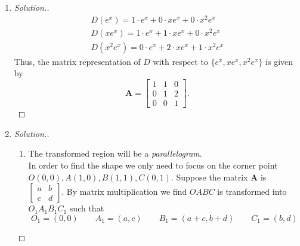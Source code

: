 \begin{enumerate}
\begin{proof}
\begin{enumerate}
\[\begin{pmatrix}
\end{pmatrix}+m_3\begin{pmatrix}
0\\0\\0\\1\\2\\1
\end{pmatrix}
\]
where $m_1,m_2,m_3\in\mathbb{R}$.\\
Therefore, $f\in\ker T$ if and only if for any $m_1,m_2,m_3\in\mathbb{R}$,
\[
\begin{aligned}
f&=m_1+m_2x+m_2y+m_3x^2+2m_3xy+m_3y^2\\
 &=m_1\x1+m_2(x+y)+m_3(x^2+2xy+y^2)
\end{aligned}
\]
Obviously, the set $\{1,x+y,x^2+2xy+y^2\}$ is ind. and it spans $\ker T$ by the above argument. Hence $\{1,x+y,x^2+2xy+y^2\}$ is a basis for $\ker T$.
\end{enumerate}\end{proof}
\item
\begin{proof}[Solution.]
\begin{gather*}
D(e^x)=1\cdot e^x+0\cdot xe^x+0\cdot x^2e^x\\
D(xe^x)=1\cdot e^x+1\cdot xe^x+0\cdot x^2e^x\\
D(x^2e^x)=0\cdot e^x+2\cdot xe^x+1\cdot x^2e^x
\end{gather*}
Thus, the matrix representation of $D$ with respect to $\{e^x,xe^x,x^2e^x\}$ is given by
\[
\bm A=\begin{bmatrix}
1&1&0\\0&1&2\\0&0&1
\end{bmatrix}.
\]
\end{proof}
\item
\begin{proof}[Solution.]
\begin{enumerate}
\item
The transformed region will be a \emph{parallelogram}.\\
In order to find the shape we only need to focus on the corner point $O(0,0),A(1,0),B(1,1),C(0,1)$. Suppose the matrix $\bm A$ is $\begin{bmatrix}
a&b\\c&d
\end{bmatrix}$. By matrix multiplication we find $OABC$ is transformed into $O_1A_1B_1C_1$ such that
\[
O_1=(0,0)\qquad A_1=(a,c)\qquad B_1=(a+c,b+d)\qquad C_1=(b,d)
\]
\end{enumerate}
\end{proof}
\end{enumerate}
